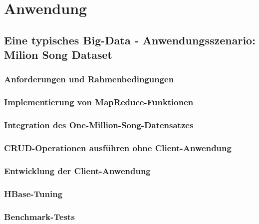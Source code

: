 \chapter{Anwendung}
\section{Eine typisches Big-Data -  Anwendungsszenario: Milion Song Dataset}
\subsection{Anforderungen und Rahmenbedingungen}
\subsection{Implementierung von MapReduce-Funktionen}
\subsection{Integration des One-Million-Song-Datensatzes}
\subsection{CRUD-Operationen ausführen ohne Client-Anwendung}
\subsection{Entwicklung der Client-Anwendung}
\subsection{HBase-Tuning}
\subsection{Benchmark-Tests}